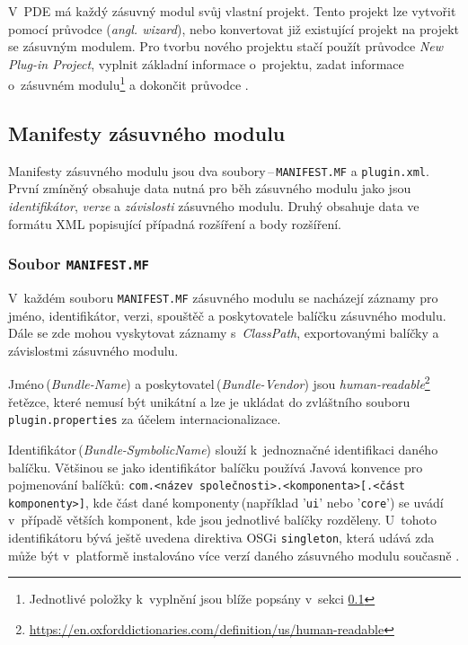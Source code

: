     V~PDE má každý zásuvný modul svůj vlastní projekt. Tento projekt lze vytvořit pomocí průvodce (\emph{angl. wizard}), nebo konvertovat již existující projekt na projekt se zásuvným modulem. Pro tvorbu nového projektu stačí použít průvodce \emph{New Plug-in Project}, vyplnit základní informace o~projektu, zadat informace o~zásuvném modulu\footnote{Jednotlivé položky k~vyplnění jsou blíže popsány v~sekci \ref{section:manifesty_zasuvneho_modulu}} a dokončit průvodce \cite{Blewitt:Eclipse4}.

    \subsection{Manifesty zásuvného modulu}
    \label{section:manifesty_zasuvneho_modulu}
    Manifesty zásuvného modulu jsou dva soubory\,--\,\texttt{MANIFEST.MF} a \texttt{plugin.xml}. První zmíněný obsahuje data nutná pro běh zásuvného modulu jako jsou \emph{identifikátor}, \emph{verze} a \emph{závislosti} zásuvného modulu. Druhý obsahuje data ve formátu XML popisující případná rozšíření a body rozšíření.

      \subsubsection{Soubor \texttt{MANIFEST.MF}}
      V~každém souboru \texttt{MANIFEST.MF} zásuvného modulu se nacházejí záznamy pro jméno, identifikátor, verzi, spouštěč a poskytovatele balíčku zásuvného modulu. Dále se zde mohou vyskytovat záznamy s~\emph{ClassPath}, exportovanými balíčky a závislostmi zásuvného modulu.

      Jméno\,(\emph{Bundle-Name}) a poskytovatel\,(\emph{Bundle-Vendor}) jsou \emph{human-readable}\footnote{\url{https://en.oxforddictionaries.com/definition/us/human-readable}} řetězce, které nemusí být unikátní a lze je ukládat do zvláštního souboru \texttt{plugin.properties} za účelem internacionalizace.

      Identifikátor\,(\emph{Bundle-SymbolicName}) slouží k~jednoznačné identifikaci daného balíčku. Většinou se jako identifikátor balíčku používá Javová konvence pro pojmenování balíčků: \texttt{com.<název společnosti>.<komponenta>[.<část komponenty>]}, kde část dané komponenty\,(například '\texttt{ui}' nebo '\texttt{core}') se uvádí v~případě větších komponent, kde jsou jednotlivé balíčky rozděleny. U~tohoto identifikátoru bývá ještě uvedena direktiva OSGi \texttt{singleton}, která udává zda může být v~platformě instalováno více verzí daného zásuvného modulu současně \cite{Blewitt:Eclipse4}.

